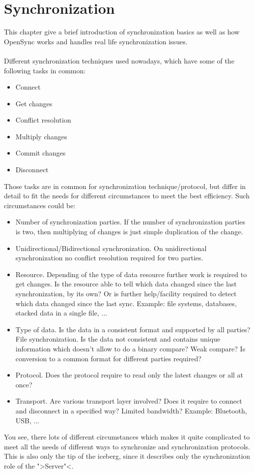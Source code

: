 \chapter{Synchronization}
This chapter give a brief introduction of synchronization basics as well as how
OpenSync works and handles real life synchronization issues.\\
\\
Different synchronization techniques used nowadays, which have some of the
following tasks in common:
\begin{itemize}
 \item Connect
 \item Get changes
 \item Conflict resolution
 \item Multiply changes
 \item Commit changes
 \item Disconnect
\end{itemize}
Those tasks are in common for synchronization technique/protocol, but differ in
detail to fit the needs for different circumstances to meet the best efficiency.
Such circumstances could be:
\begin{itemize}
 \item Number of synchronization parties. If the number of synchronization
 parties is two, then multiplying of changes is just simple duplication of the
 change.
 \item Unidirectional/Bidirectional synchronization. On unidirectional
 synchronization no conflict resolution required for two parties.
 \item Resource. Depending of the type of data resource further work is required
 to get changes. Is the resource able to tell which data changed since the last
 synchronization, by its own? Or is further help/facility required to detect
 which data changed since the last sync. Example: file systems, databases,
 stacked data in a single file, ...
 \item Type of data. Is the data in a consistent format and supported by all
 parties? File synchronization. Is the data not consistent and contains unique
 information which doesn't allow to do a binary compare? Weak compare? Is 
 conversion to a common format for different parties required?
 \item Protocol. Does the protocol require to read only the latest changes or 
 all at once?
 \item Transport. Are various transport layer involved? Does it require to
 connect and disconnect in a specified way? Limited bandwidth? Example: 
 Bluetooth, USB, ...
\end{itemize}
You see, there lots of different circumstances which makes it quite complicated
to meet all the needs of different ways to synchronize and synchronization 
protocols.\\
This is also only the tip of the iceberg, since it describes only the
synchronization role of the ">Server"<. 

